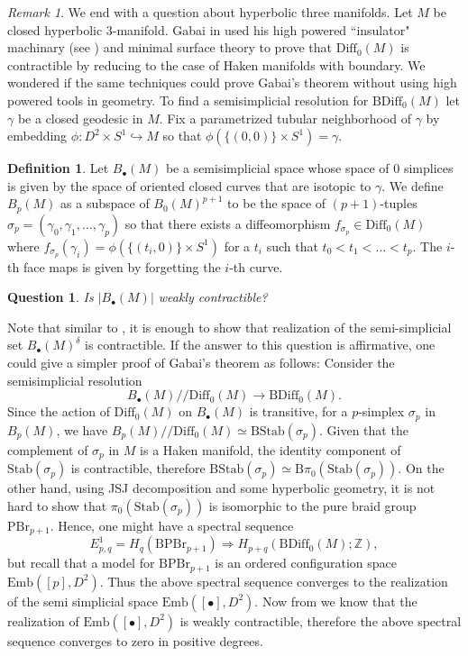 \documentclass[a4paper]{amsart}
\newtheorem{quest}[thm]{Question}
\theoremstyle{definition}
\newtheorem{defn}[thm]{Definition}
\theoremstyle{remark}
\newtheorem{rem}[thm]{Remark}
\newcommand{\bZ}{\mathbb{Z}}
\newcommand\Diff{\mathrm{Diff}}
\newcommand\BDiff{\mathrm{BDiff}}
\newcommand{\hcoker}{/\!\!/}
\numberwithin{equation}{section}
\begin{document}
\begin{rem} We end with a question about hyperbolic three manifolds. Let $M$ be closed hyperbolic $3$-manifold. Gabai in \cite{gabai2001smale} used his high powered ``insulator" machinary (see \cite{gabai1997geometric}) and minimal surface theory to prove that $\Diff_0(M)$ is contractible by reducing to the case of Haken manifolds with boundary. We wondered if the same techniques could prove Gabai's theorem without using high powered tools in geometry.  To find a semisimplicial resolution for $\BDiff_0(M)$ let  $\gamma$ be a closed geodesic in $M$. Fix a parametrized tubular neighborhood of $\gamma$ by embedding $\phi: D^2\times S^1\hookrightarrow M$ so that $\phi(\{(0,0)\}\times S^1)=\gamma$. 
\begin{defn}Let $B_{\bullet}(M)$ be a semisimplicial space whose space of $0$ simplices is given by the space of oriented closed curves that are isotopic to $\gamma$. We define $B_p(M)$ as a subspace of $B_0(M)^{p+1}$ to be the space of $(p+1)$-tuples $\sigma_p=(\gamma_0,\gamma_1,\dots, \gamma_p)$ so that there exists a diffeomorphism $f_{\sigma_p}\in \Diff_0(M)$ where $f_{\sigma_p}(\gamma_i)=\phi(\{(t_i,0)\}\times S^1)$ for a $t_i$ such that $ t_0<t_1<\dots<t_p$. The $i$-th face maps is given by forgetting the $i$-th curve.
\end{defn}
\begin{quest}
Is $|B_{\bullet}(M)|$ weakly contractible?
\end{quest}
Note that similar to , it is enough to show that realization of the semi-simplicial set $B_{\bullet}(M)^{\delta}$ is contractible. If the answer to this question is affirmative, one could give a simpler proof of Gabai's theorem as follows: Consider the semisimplicial resolution
\[
B_{\bullet}(M)\hcoker \Diff_0(M)\to \BDiff_0(M).
\]
Since the action of $\Diff_0(M)$ on $B_{\bullet}(M)$ is transitive, for a $p$-simplex $\sigma_p$ in $B_p(M)$, we have $B_p(M)\hcoker \Diff_0(M)\simeq \mathrm{B}\text{Stab}(\sigma_p)$. Given that the complement of $\sigma_p$ in $M$ is a Haken manifold, the identity component of $\text{Stab}(\sigma_p)$ is contractible, therefore $ \mathrm{B}\text{Stab}(\sigma_p)\simeq  \mathrm{B}\pi_0(\text{Stab}(\sigma_p))$. On the other hand, using JSJ decomposition and some hyperbolic geometry, it is not hard to show that $\pi_0(\text{Stab}(\sigma_p))$ is isomorphic to the pure braid group $\text{PBr}_{p+1}$. Hence, one might have a spectral sequence
\[
E^1_{p,q}=H_q(\mathrm{B}\text{PBr}_{p+1})\Rightarrow H_{p+q}(\BDiff_0(M);\bZ),
\]
but recall that a model for $\mathrm{B}\text{PBr}_{p+1}$ is an ordered configuration space $\text{Emb}([p], D^2)$. Thus the above spectral sequence converges to the realization of the semi simplicial space $\text{Emb}([\bullet], D^2)$. Now from  we know that the realization of $\text{Emb}([\bullet], D^2)$ is weakly contractible, therefore the above spectral sequence converges to zero in positive degrees.  
\end{rem}
\end{document}
